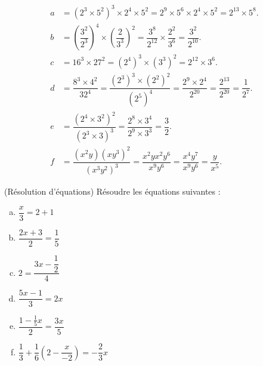 \documentclass[12pt,
addpoints,
fleqn
]{exam}
\begin{document}
\begin{questions}
    \begin{solution}
        \begin{align*}
            a & =\left(2^3\times 5^2\right)^3 \times 2^4 \times 5^2 = 2^9\times 5^6 \times 2^4 \times 5^2 = \boxed{2^{13}\times 5^8}.                              \\
            b & =\left(\dfrac{3^2}{2^3}\right)^4\times\left(\dfrac{2}{3^3}\right)^2 = \dfrac{3^8}{2^12}\times\dfrac{2^2}{3^6}=\boxed{\dfrac{3^2}{2^{10}}}.         \\
            c & =16^3\times 27^2 = \left(2^4\right)^3\times\left(3^3\right)^2 = \boxed{2^{12}\times 3^6}.                                                          \\
            d & =\dfrac{8^3\times 4^2}{32^4} = \dfrac{(2^3)^3\times(2^2)^2}{(2^5)^4}= \dfrac{2^9\times 2^4}{2^{20}}=\dfrac{2^{13}}{2^{20}}=\boxed{\dfrac{1}{2^7}}. \\
            e & =\dfrac{\left(2^4\times 3^2\right)^2}{\left(2^3\times 3\right)^3} = \dfrac{2^8\times 3^4}{2^9\times 3^3}=\boxed{\dfrac{3}{2}}.                     \\
            f & =\dfrac{(x^2y)(xy^3)^2}{(x^3y^2)^3}=\dfrac{x^2yx^2y^6}{x^9y^6}=\dfrac{x^4 y^7}{x^9y^6} =\boxed{\dfrac{y}{x^5}}.
        \end{align*}

    \end{solution}

    \question (Résolution d'équations) Résoudre les équations suivantes :
    \begin{multicols}{3}
        \begin{enumerate}[(a)]
            \item $\dfrac{x}{3}=2+1$
            \item $\dfrac{2x+3}{2}=\dfrac{1}{5}$
            \item $2=\dfrac{3x-\dfrac{1}{2}}{4}$
            \item $\dfrac{5x-1}{3}=2x$
            \item $\dfrac{1-\frac{1}{5}x}{2}=\dfrac{3x}{5}$
            \item $\dfrac{1}{3}+\dfrac{1}{6}\left(2-\dfrac{x}{-2}\right)= -\dfrac{2}{3}x$
        \end{enumerate}
    \end{multicols}

    \begin{solution}
\end{solution}
\end{questions}
\end{document}
